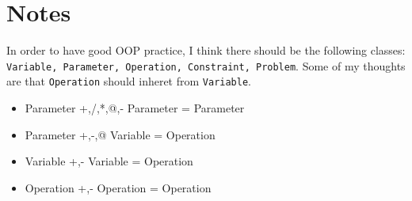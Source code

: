 \documentclass[11pt]{article}
\begin{document}
\section{Notes}
In order to have good OOP practice, I think there should be the following classes:
\texttt{Variable, Parameter, Operation, Constraint, Problem}.
Some of my thoughts are that \texttt{Operation} should inheret from \texttt{Variable}.

\begin{itemize}
    \item Parameter +,/,*,@,- Parameter = Parameter
    \item Parameter +,-,@ Variable = Operation
    \item Variable +,- Variable = Operation
    \item Operation +,- Operation = Operation
\end{itemize}
\end{document}
